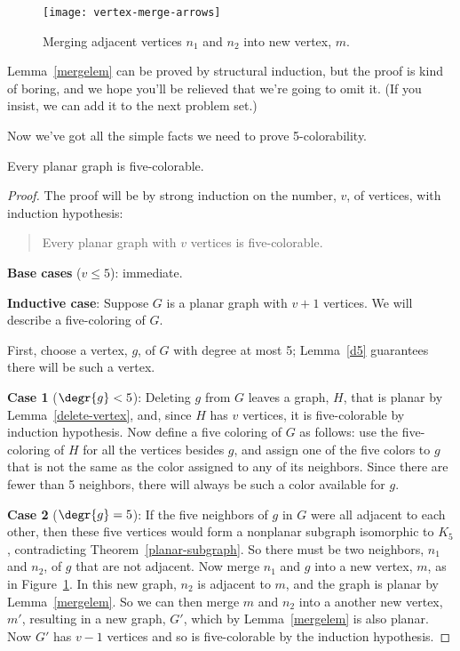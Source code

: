 \begin{figure}%
\texttt{[image: vertex-merge-arrows]}
\caption{Merging adjacent vertices $n_1$ and $n_2$ into new vertex, $m$.}
\label{fig:merged}
\end{figure}

Lemma~\ref{mergelem} can be proved by structural induction, but the proof
is kind of boring, and we hope you'll be relieved that we're going to omit
it.  (If you insist, we can add it to the next problem set.)

Now we've got all the simple facts we need to prove 5-colorability.
\begin{theorem}
Every planar graph is five-colorable.
\end{theorem}

\begin{proof}
The proof will be by strong induction on the number, $v$, of vertices, with
induction hypothesis:
\begin{quote}
Every planar graph with $v$ vertices is five-colorable.
\end{quote}

\textbf{Base cases} ($v \leq 5$): immediate.

\textbf{Inductive case}: Suppose $G$ is a planar graph with $v+1$
vertices.  We will describe a five-coloring of $G$.

First, choose a vertex, $g$, of $G$ with degree at most 5; Lemma~\ref{d5}
guarantees there will be such a vertex.

\textbf{Case 1} ($\degr{g}<5$): Deleting $g$ from $G$ leaves a graph, $H$,
that is planar by Lemma~\ref{delete-vertex}, and, since $H$ has $v$ vertices,
it is five-colorable by induction hypothesis.  Now define a five coloring
of $G$ as follows: use the five-coloring of $H$ for all the vertices besides
$g$, and assign one of the five colors to $g$ that is not the same as the
color assigned to any of its neighbors.  Since there are fewer than 5
neighbors, there will always be such a color available for $g$.

\textbf{Case 2} ($\degr{g}=5$): If the five neighbors of $g$ in $G$ were
all adjacent to each other, then these five vertices would form a
nonplanar subgraph isomorphic to $K_5$, contradicting
Theorem~\ref{planar-subgraph}.  So there must be two neighbors, $n_1$ and
$n_2$, of $g$ that are not adjacent.  Now merge $n_1$ and $g$ into a new
vertex, $m$, as in Figure~\ref{fig:merged}.  In this new graph, $n_2$ is
adjacent to $m$, and the graph is planar by Lemma~\ref{mergelem}.  So we
can then merge $m$ and $n_2$ into a another new vertex, $m'$, resulting in
a new graph, $G'$, which by Lemma~\ref{mergelem} is also planar.  Now $G'$
has $v-1$ vertices and so is five-colorable by the induction hypothesis.


\end{proof}
